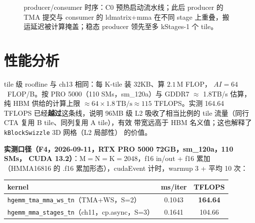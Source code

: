 \begin{figure}[htbp]
\caption{producer/consumer 时序：C0 预热启动流水线；此后 producer 的 TMA 提交与 consumer 的 ldmatrix+mma 在不同 stage 上重叠，搬运延迟被计算掩盖；稳态 producer 领先至多 kStages-1 个 tile。}
\label{fig:14-2}
\end{figure}

\section{性能分析}

tile 级 roofline 与 ch13 相同：每 K-tile 装 32KB、算 $2.1\,\mathrm{M}$ FLOP，
$AI = 64$~FLOP/B。按 PRO 5000（110 SMs，sm\_120a）与 GDDR7 $\approx$ 1.8TB/s
估算，纯 HBM 供给的计算上限 $\approx 64 \times 1.8\,\mathrm{TB/s} \approx
115$ TFLOPS。实测 164.64 TFLOPS 已经\textbf{越过}这条线，说明 96MB 级 L2
吸收了相当比例的 tile 流量（同行 CTA 复用 B tile、同列复用 A tile），有效
带宽远高于 HBM 名义值；这也解释了 \texttt{k\allowbreak{}Block\allowbreak{}Swizzle} 3D 网格（L2 局部性）
的价值。

\textbf{实测口径（F4，2026-09-11，RTX PRO 5000 72GB，sm\_120a，110 SMs，
CUDA 13.2）}：M$=$N$=$K$=$2048，f16 in/out + f16 累加（HMMA16816 的 .f16
累加形态），cudaEvent 计时，warmup 3 + 平均 10 次：

\begin{center}
\begin{tabular}{lcc}
\toprule
kernel & ms/iter & TFLOPS \\
\midrule
\texttt{hgemm\_\allowbreak{}tma\_\allowbreak{}mma\_\allowbreak{}ws\_\allowbreak{}tn}（TMA+WS，S=2） & 0.1043 & \textbf{164.64} \\
\texttt{hgemm\_\allowbreak{}mma\_\allowbreak{}stages\_\allowbreak{}tn}（ch11，cp.async，S=3） & 0.1641 & 104.66 \\
\bottomrule
\end{tabular}
\end{center}

